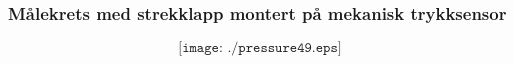 \documentclass[aspectratio=169,xcolor=dvipsnames]{beamer}
\begin{document}
%
%
%
\begin{frame}
	\frametitle{Målekrets med strekklapp montert på mekanisk trykksensor}

	$$\texttt{[image: ./pressure49.eps]}$$
\end{frame}

%
%
%
%
%
%
\end{document}
